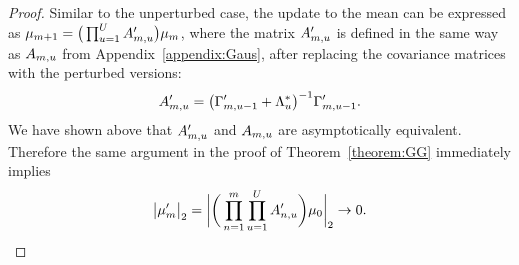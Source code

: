 \begin{proof}
Similar to the unperturbed case, the update to the mean can be expressed as $\mu_{m+1} = \big(\prod_{u = 1}^UA'_{m, u}\big)\mu_m$, where the matrix $A'_{m, u}$ is defined in the same way as $A_{m, u}$ from Appendix~\ref{appendix:Gaus}, after replacing the covariance matrices with the perturbed versions: 
$$
A'_{m, u} = \big(\Gamma'_{m, u - 1} + \Lambda^*_u\big)^{-1}\Gamma'_{m, u - 1}.
$$
We have shown above that $A'_{m, u}$ and $A_{m, u}$ are asymptotically equivalent. 
Therefore the same argument in the proof of Theorem~\ref{theorem:GG} immediately implies
$$
\big| \mu'_{m} \big|_2 =
  \bigg|
    \bigg(
      \prod_{n = 1}^m\prod_{u = 1}^U A'_{n, u}
    \bigg)
    \mu_0
  \bigg|_2 \rightarrow 0.
$$

   \end{proof}

